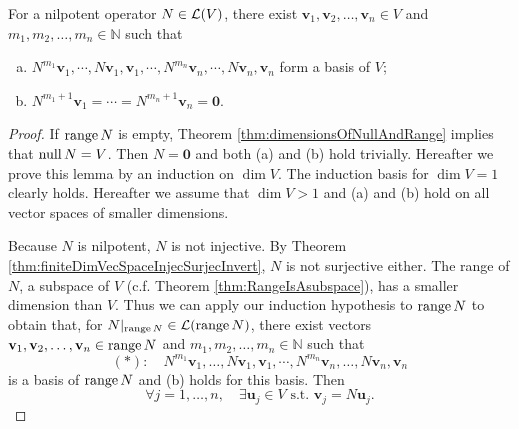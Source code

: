 \begin{lem}
  \label{lem:nilpotentOpLeadsToBasis}
  For a nilpotent operator $N\in{\cal L}(V)$,
  there exist
  $\mathbf{v}_1, \mathbf{v}_2, \ldots, \mathbf{v}_n\in V$
  and $m_1, m_2, \ldots, m_n\in \mathbb{N}$
  such that
  \begin{enumerate}[(a)]\itemsep0em
  \item $N^{m_1}\mathbf{v}_1, \cdots, N\mathbf{v}_1, \mathbf{v}_1,
    \cdots, N^{m_n}\mathbf{v}_n, \cdots, N\mathbf{v}_n, \mathbf{v}_n$
    form a basis of $V$;
  \item $N^{m_1+1}\mathbf{v}_1 = \cdots = N^{m_n+1}\mathbf{v}_n=\mathbf{0}$.
  \end{enumerate}
\end{lem}
\begin{proof}
  If $\mathrm{range}\,N$ is empty, Theorem \ref{thm:dimensionsOfNullAndRange}
  implies that $\mathrm{null}\, N=V$.
  Then $N=\mathbf{0}$ and both (a) and (b) hold trivially.
  Hereafter we prove this lemma by an induction on $\dim V$.
  The induction basis for $\dim V=1$ clearly holds.
  Hereafter we assume that $\dim V>1$ and (a) and (b)
  hold on all vector spaces of smaller dimensions.

  Because $N$ is nilpotent, $N$ is not injective.
  By Theorem \ref{thm:finiteDimVecSpaceInjecSurjecInvert},
  $N$ is not surjective either.
  The range of $N$, 
  a subspace of $V$ (c.f. Theorem \ref{thm:RangeIsAsubspace}),
  has a smaller dimension than $V$.
  Thus we can apply our induction hypothesis to $\mathrm{range}\,N$
  to obtain that, 
  for $N|_{\mathrm{range}\,N}\in{\cal L}(\mathrm{range}\,N)$,
  there exist vectors 
  $\mathbf{v}_1, \mathbf{v}_2, \ldots, \mathbf{v}_n\in \mathrm{range}\,N$
  and $m_1, m_2, \ldots, m_n\in \mathbb{N}$ such that
  \begin{displaymath}
    (*):\quad N^{m_1}\mathbf{v}_1, \ldots, N\mathbf{v}_1, \mathbf{v}_1,
    \cdots, N^{m_n}\mathbf{v}_n, \ldots, N\mathbf{v}_n, \mathbf{v}_n
  \end{displaymath}
  is a basis of $\mathrm{range}\,N$
  and (b) holds for this basis. Then
  \begin{displaymath}
    \forall j=1,\ldots,n,\quad \exists \mathbf{u}_j\in V
    \text{ s.t. } \mathbf{v}_j=N \mathbf{u}_j.
  \end{displaymath}


\end{proof}
